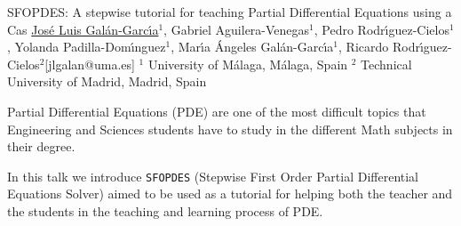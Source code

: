 


\begin{abstract_online}{SFOPDES: A stepwise tutorial for teaching Partial Differential Equations using a {\sc Cas}}{%
        \underline{Jos\'e Luis Gal\'an-Garc\'{\i}a}$^{1}$, Gabriel Aguilera-Venegas$^{1}$, Pedro Rodr\'{\i}guez-Cielos$^{1}$, Yolanda Padilla-Dom\'{\i}nguez$^{1}$, Mar\'{\i}a \'Angeles Gal\'an-Garc\'{\i}a$^{1}$, Ricardo Rodr\'{\i}guez-Cielos$^{2}$}{[jlgalan@uma.es]
        }{%
        $^1$ University of M\'alaga, M\'alaga, Spain \newline{}$^2$ Technical University of Madrid, Madrid, Spain
}
    
Partial Differential Equations (PDE) are one of the most difficult topics that Engineering and Sciences students have to study in the different Math subjects in their degree.

In this talk we introduce {\tt SFOPDES} (Stepwise First Order Partial Differential Equations Solver) aimed to be used as a tutorial for helping both the teacher and the students in the teaching and learning process of PDE.


\end{abstract_online}
